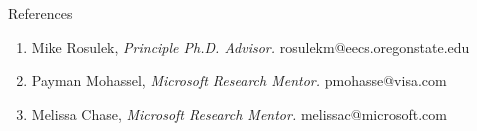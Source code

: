 \documentclass{resume} %
\begin{document}

\begin{rSection}{References}
	
	\begin{enumerate}[label=R\arabic*]
		
		\item Mike Rosulek, \emph{Principle Ph.D. Advisor.} rosulekm@eecs.oregonstate.edu
		
		\item Payman Mohassel,  \emph{Microsoft Research Mentor.} pmohasse@visa.com
		
		\item Melissa Chase, \emph{Microsoft Research Mentor.} melissac@microsoft.com
		
		
	\end{enumerate}
	
\end{rSection}






\end{document}
